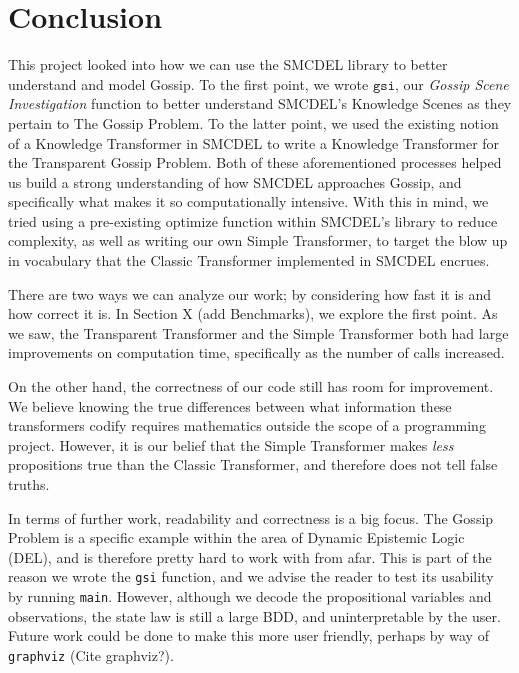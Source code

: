 
\section{Conclusion}\label{sec:Conclusion}

This project looked into how we can use the SMCDEL library to better understand and model Gossip. To the first point, we wrote $\texttt{gsi}$, our \textit{Gossip Scene Investigation} function to better understand SMCDEL's Knowledge Scenes as they pertain to The Gossip Problem. To the latter point, we used the existing notion of a Knowledge Transformer in SMCDEL to write a Knowledge Transformer for the Transparent Gossip Problem. Both of these aforementioned processes helped us build a strong understanding of how SMCDEL approaches Gossip, and specifically what makes it so computationally intensive. With this in mind, we tried using a pre-existing optimize function within SMCDEL's library to reduce complexity, as well as writing our own Simple Transformer, to target the blow up in vocabulary that the Classic Transformer implemented in SMCDEL encrues. 

There are two ways we can analyze our work; by considering how fast it is and how correct it is. In Section X (add Benchmarks), we explore the first point. As we saw, the Transparent Transformer and the Simple Transformer both had large improvements on computation time, specifically as the number of calls increased. 

On the other hand, the correctness of our code still has room for improvement. We believe knowing the true differences between what information these transformers codify requires mathematics outside the scope of a programming project. However, it is our belief that the Simple Transformer makes \textit{less} propositions true than the Classic Transformer, and therefore does not tell false truths. 

In terms of further work, readability and correctness is a big focus. The Gossip Problem is a specific example within the area of Dynamic Epistemic Logic (DEL), and is therefore pretty hard to work with from afar. This is part of the reason we wrote the \texttt{gsi} function, and we advise the reader to test its usability by running \texttt{main}. However, although we decode the propositional variables and observations, the state law is still a large BDD, and uninterpretable by the user. Future work could be done to make this more user friendly, perhaps by way of \texttt{graphviz} (Cite graphviz?).


